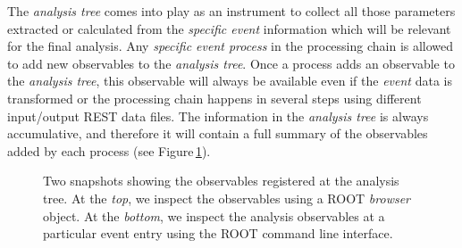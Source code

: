 The \emph{analysis tree} comes into play as an instrument to collect all those parameters extracted or calculated from the \emph{specific event} information which will be relevant for the final analysis.  Any \emph{specific event process} in the processing chain is allowed to add new observables to the \emph{analysis tree}. Once a process adds an observable to the \emph{analysis tree}, this observable will always be available even if the \emph{event} data is transformed or the processing chain happens in several steps using different input/output REST data files. The information in the \emph{analysis tree} is always accumulative, and therefore it will contain a full summary of the observables added by each process (see Figure\,\ref{fig:observables}).


\begin{figure}[tb]
  \centering
	\caption{Two snapshots showing the observables registered at the analysis tree. At the \emph{top}, we inspect the observables using a ROOT \emph{browser} object. At the \emph{bottom}, we inspect the analysis observables at a particular event entry using the ROOT command line interface.}\label{fig:observables}
\end{figure}

